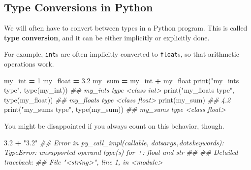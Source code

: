 \documentclass[
  12pt,
  krantz2]{krantz}
\makeatletter
\newenvironment{Shaded}{\begin{snugshade}}{\end{snugshade}}
\newcommand{\BuiltInTok}[1]{#1}
\newcommand{\CommentTok}[1]{\textcolor[rgb]{0.37,0.37,0.37}{\textit{#1}}}
\newcommand{\DecValTok}[1]{\textcolor[rgb]{0.06,0.06,0.06}{#1}}
\newcommand{\FloatTok}[1]{\textcolor[rgb]{0.06,0.06,0.06}{#1}}
\newcommand{\NormalTok}[1]{#1}
\newcommand{\OperatorTok}[1]{\textcolor[rgb]{0.43,0.43,0.43}{\textbf{#1}}}
\newcommand{\StringTok}[1]{\textcolor[rgb]{0.5,0.5,0.5}{#1}}
\newenvironment{kframe}{%
\medskip{}
\setlength{\fboxsep}{.8em}
 \def\at@end@of@kframe{}%
 \ifinner\ifhmode%
  \def\at@end@of@kframe{\end{minipage}}%
  \begin{minipage}{\columnwidth}%
 \fi\fi%
 \def\FrameCommand##1{\hskip\@totalleftmargin \hskip-\fboxsep
 \colorbox{shadecolor}{##1}\hskip-\fboxsep
     \hskip-\linewidth \hskip-\@totalleftmargin \hskip\columnwidth}%
 \MakeFramed {\advance\hsize-\width
   \@totalleftmargin\z@ \linewidth\hsize
   \@setminipage}}%
 {\par\unskip\endMakeFramed%
 \at@end@of@kframe}
\renewenvironment{Shaded}{\begin{kframe}}{\end{kframe}}
\makeatother
\begin{document}
\hypertarget{type-conversions-in-python}{%
\subsection{Type Conversions in Python}\label{type-conversions-in-python}}

We will often have to convert between types in a Python program. This is called \textbf{type conversion}, and it can be either implicitly or explicitly done.

For example, \texttt{int}s are often implicitly converted to \texttt{float}s, so that arithmetic operations work.

\begin{Shaded}
\begin{Highlighting}[]
\NormalTok{my\_int }\OperatorTok{=} \DecValTok{1}
\NormalTok{my\_float }\OperatorTok{=} \FloatTok{3.2}
\NormalTok{my\_sum }\OperatorTok{=}\NormalTok{ my\_int }\OperatorTok{+}\NormalTok{ my\_float}
\BuiltInTok{print}\NormalTok{(}\StringTok{"my\_int\textquotesingle{}s type"}\NormalTok{, }\BuiltInTok{type}\NormalTok{(my\_int))}
\CommentTok{\#\# my\_int\textquotesingle{}s type \textless{}class \textquotesingle{}int\textquotesingle{}\textgreater{}}
\BuiltInTok{print}\NormalTok{(}\StringTok{"my\_float\textquotesingle{}s type"}\NormalTok{, }\BuiltInTok{type}\NormalTok{(my\_float))}
\CommentTok{\#\# my\_float\textquotesingle{}s type \textless{}class \textquotesingle{}float\textquotesingle{}\textgreater{}}
\BuiltInTok{print}\NormalTok{(my\_sum)}
\CommentTok{\#\# 4.2}
\BuiltInTok{print}\NormalTok{(}\StringTok{"my\_sum\textquotesingle{}s type"}\NormalTok{, }\BuiltInTok{type}\NormalTok{(my\_sum))}
\CommentTok{\#\# my\_sum\textquotesingle{}s type \textless{}class \textquotesingle{}float\textquotesingle{}\textgreater{}}
\end{Highlighting}
\end{Shaded}

You might be disappointed if you always count on this behavior, though.

\begin{Shaded}
\begin{Highlighting}[]
\FloatTok{3.2} \OperatorTok{+} \StringTok{"3.2"}
\CommentTok{\#\# Error in py\_call\_impl(callable, dots$args, dots$keywords): TypeError: unsupported operand type(s) for +: \textquotesingle{}float\textquotesingle{} and \textquotesingle{}str\textquotesingle{}}
\CommentTok{\#\# }
\CommentTok{\#\# Detailed traceback:}
\CommentTok{\#\#   File "\textless{}string\textgreater{}", line 1, in \textless{}module\textgreater{}}
\end{Highlighting}
\end{Shaded}
\end{document}
